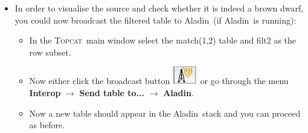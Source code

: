 \documentclass [a4paper, 12pt]{article}
\newcommand{\aladin}{{\textsc{A}{ladin}}}
\newcommand{\topcat}{{\textsc{Topcat}}}
\begin{document}
\begin{itemize}
    \item In order to visualise the source and check whether it is indeed a 
    brown dwarf, you could now broadcast the filtered table to \aladin\ (if 
    \aladin\ is running):
    \begin{itemize}
        \item In the \topcat\ main window select the match(1,2) table and filt2 
        as the row subset. 
        \item Now either click the broadcast button 
        \includegraphics[width=0.04        
        \textwidth]{../images/topcat_button_broadcast.jpg} or go through the 
        menu 
        \textbf{Interop} $\rightarrow$ \textbf{Send table to... } $\rightarrow$ 
        \textbf{Aladin}. 
        \item Now a new table should appear in the \aladin\ stack and you can 
        proceed as before. 
    \end{itemize}
\end{itemize}
\end{document}
